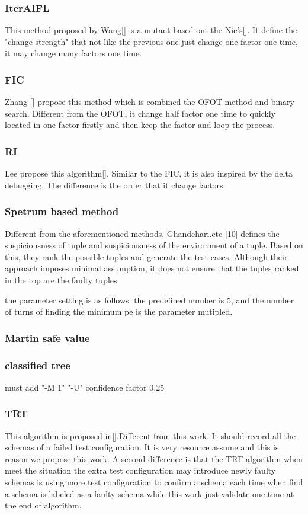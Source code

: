 \documentclass[10pt,journal,cspaper,compsoc]{IEEEtran}
\begin{document}
\subsubsection{IterAIFL}
This method proposed by Wang[] is a mutant based ont the Nie's[]. It define the "change strength" that not like the previous one just change one factor one time, it may change many factors one time.

\subsubsection{FIC}
Zhang [] propose this method which is combined the OFOT method and binary search. Different from the OFOT, it change half factor one time to quickly located in one factor firstly and then keep the factor and loop the process.

\subsubsection{RI}
Lee propose this algorithm[]. Similar to the FIC, it is also inspired by the delta debugging. The difference is the order that it change factors.

\subsubsection{Spetrum based method}
Different from the aforementioned methods, Ghandehari.etc [10] defines the suspiciousness of tuple and suspiciousness of the environment of a tuple. Based on this, they rank the possible tuples and generate the test cases. Although their approach imposes minimal assumption, it does not ensure that the tuples ranked in the top are the faulty tuples.

the parameter setting is as follows: the predefined number is 5, and the number of turns of finding the minimum pe is the parameter mutipled.
\subsubsection{Martin safe value}


\subsubsection{classified tree}
must add "-M 1" "-U" confidence factor 0.25

\subsubsection{TRT}
This algorithm is proposed in[].Different from this work. It should record all the schemas of a failed test configuration. It is very resource assume and this is reason we propose this work. A second difference is that the TRT algorithm when meet the situation the extra test configuration may introduce newly faulty schemas is using more test configuration to confirm a schema each time when find a schema is labeled as a faulty schema while this work just validate one time at the end of algorithm.
\end{document}
